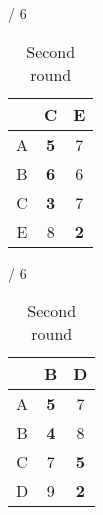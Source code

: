 \documentclass[a4paper, 11 pt, article, accentcolor=tud7b]{tudreport}
\begin{document}
\begin{table}[h]
\begin{subtable}[b]{\textwidth / 6}
\begin{tabular}{| c | c | c |}
	    \hline
	      & C                  & E                  \\ \hline
	    A & \textbf{5}         & 7                  \\ \hline
	    B & \textbf{6}         & 6                  \\ \hline
	    C & \textbf{3}         & 7                  \\ \hline
	    E & 8                  & \textbf{2}         \\ \hline
	    \end{tabular}
	    \caption{$D^{D}$}
	  \end{subtable}
	  \hfill
	  \begin{subtable}[b]{\textwidth / 6}
	    \begin{tabular}{| c | c | c |}
	    \hline
	      & B                   & D                    \\ \hline
	    A & \textbf{5}          & 7                    \\ \hline
	    B & \textbf{4}          & 8                    \\ \hline
	    C & 7                   & \textbf{5}           \\ \hline
	    D & 9                   & \textbf{2}           \\ \hline
	    \end{tabular}
	    \caption{$D^{E}$}
	  \end{subtable}
	  \caption{Second round}
	\end{table}
	
\end{document}
